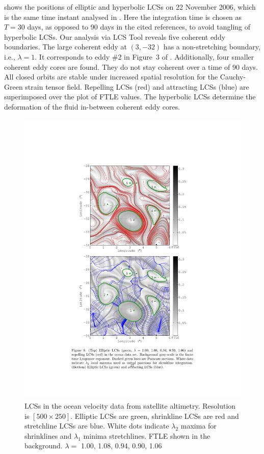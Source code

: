 \documentclass{elsarticle}
\begin{document}
 shows the positions of elliptic and hyperbolic LCSs on 22 November 2006, which is the same time instant analysed in \citet{haller13:_coher_lagran,beron-vera13:_objec_agulh}. Here the integration time is chosen as $T = 30$ days, as opposed to 90 days in the cited references, to avoid tangling of hyperbolic LCSs. Our analysis via LCS Tool reveals five coherent eddy boundaries. The large coherent eddy at $(3,-32)$ has a non-stretching boundary, i.e., $\lambda = 1$. It corresponds to eddy \#2 in Figure~3 of \citet{beron-vera13:_objec_agulh}. Additionally, four smaller coherent eddy cores are found. They do not stay coherent over a time of 90 days. All closed orbits are stable under increased spatial resolution for the Cauchy-Green strain tensor field. Repelling LCSs (red) and attracting LCSs (blue) are superimposed over the plot of FTLE values. The hyperbolic LCSs determine the deformation of the fluid in-between coherent eddy cores.

\begin{figure}
\begin{center}
\includegraphics[width=.8\textwidth]{graphics/ocean_dataset/lambda_hyperbolic_lcs}
\end{center}
\caption{
LCSs in the ocean velocity data from satellite altimetry.
Resolution is $[500\times250]$.
Elliptic LCSs are green, shrinkline LCSs are red and stretchline LCSs are blue. 
White dots indicate $\lambda_2$ maxima for shrinklines and $\lambda_1$ minima stretchlines.
FTLE shown in the background.
$\lambda=$ 1.00, 1.08, 0.94, 0.90, 1.06
}
\label{f:ocean dataset LCS}
\end{figure}
\end{document}
